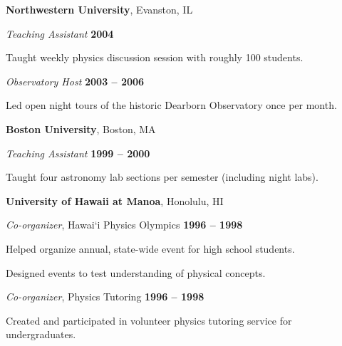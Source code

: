 \documentclass[11pt]{article}
\newcommand{\halfblankline}{\quad\vspace{-0.5\baselineskip}\pagebreak[3]}
\begin{document}
\halfblankline

\textbf{Northwestern University}, Evanston, IL
\begin{outerlist}

\item[] \textit{Teaching Assistant} 
    \hfill \textbf{2004}
    \begin{innerlist}
        \item Taught weekly physics discussion session with roughly 100 students.
    \end{innerlist}

\item[] \textit{Observatory Host} 
    \hfill \textbf{2003 -- 2006}
    \begin{innerlist}
        \item Led open night tours of the historic Dearborn Observatory once per month.
    \end{innerlist}
    
\end{outerlist}

\halfblankline

\textbf{Boston University}, Boston, MA
\begin{outerlist}

\item[] \textit{Teaching Assistant} 
    \hfill \textbf{1999 -- 2000}
    \begin{innerlist}
        \item Taught four astronomy lab sections per semester (including night labs).
    \end{innerlist}
\end{outerlist}

\halfblankline

\textbf{University of Hawaii at Manoa}, Honolulu, HI
\begin{outerlist}
\item[] \textit{Co-organizer}, Hawai`i Physics Olympics
    \hfill \textbf{1996 -- 1998}
    \begin{innerlist}
        \item Helped organize annual, state-wide event for high school students.
        \item Designed events to test understanding of physical concepts.
    \end{innerlist}
\end{outerlist}

\begin{outerlist}
\item[] \textit{Co-organizer}, Physics Tutoring
    \hfill \textbf{1996 -- 1998}
    \begin{innerlist}
        \item Created and participated in volunteer physics tutoring service for undergraduates.
    \end{innerlist}
\end{outerlist}
\end{document}
